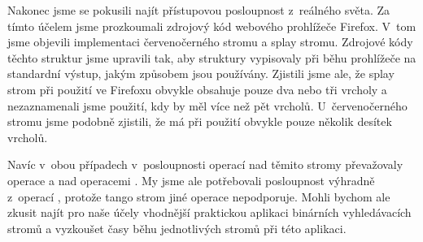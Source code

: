 Nakonec jsme se pokusili najít přístupovou posloupnost z~reálného světa. Za tímto účelem jsme prozkoumali zdrojový kód webového prohlížeče Firefox. V~tom jsme objevili implementaci červenočerného stromu a splay stromu. Zdrojové kódy těchto struktur jsme upravili tak, aby struktury vypisovaly při běhu prohlížeče na standardní výstup, jakým způsobem jsou používány. Zjistili jsme ale, že splay strom při použití ve Firefoxu obvykle obsahuje pouze dva nebo tři vrcholy a nezaznamenali jsme použití, kdy by měl více než pět vrcholů. U~červenočerného stromu jsme podobně zjistili, že má při použití obvykle pouze několik desítek vrcholů.

Navíc v~obou případech v~posloupnosti operací nad těmito stromy převažovaly operace  a  nad operacemi . My jsme ale potřebovali posloupnost výhradně z~operací , protože tango strom jiné operace nepodporuje. Mohli bychom ale zkusit najít pro naše účely vhodnější praktickou aplikaci binárních vyhledávacích stromů a vyzkoušet časy běhu jednotlivých stromů při této aplikaci.
